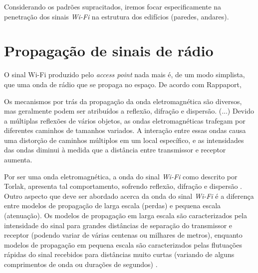\documentclass[
	12pt,				%
	twoside,			%
	a4paper,			%
	english,			%
	french,				%
	spanish,			%
	brazil				%
	]{abntex2}
\begin{document}
Considerando os padrões supracitados, iremos focar especificamente na
penetração dos sinais \emph{Wi-Fi} na estrutura dos edifícios (paredes,
andares).

\section{Propagação de sinais de
rádio}\label{propagauxe7uxe3o-de-sinais-de-ruxe1dio}

O sinal Wi-Fi produzido pelo \emph{access point} nada mais é, de um modo
simplista, que uma onda de rádio que se propaga no espaço. De acordo com
Rappaport,

\begin{citacao}
    Os mecanismos por trás da propagação da onda eletromagnética são diversos, mas geralmente podem ser atribuídos a reflexão, difração e dispersão. (...) Devido a múltiplas reflexões de vários objetos, as ondas eletromagnéticas trafegam por diferentes caminhos de tamanhos variados. A interação entre essas ondas causa uma distorção de caminhos múltiplos em um local específico, e as intensidades das ondas diminui à medida que a distância entre transmissor e receptor aumenta. \cite[p. 72]{RAPPAPORT}
    
\end{citacao}

Por ser uma onda eletromagnética, a onda do sinal \emph{Wi-Fi} como
descrito por Torlak, apresenta tal comportamento, sofrendo reflexão,
difração e dispersão \cite{TORLAK}. Outro aspecto que deve ser abordado
acerca da onda do sinal \emph{Wi-Fi} é a diferença entre modelos de
propagação de larga escala (perdas) e pequena escala (atenuação). Os
modelos de propagação em larga escala são caracterizados pela
intensidade do sinal para grandes distâncias de separação do transmissor
e receptor (podendo variar de várias centenas ou milhares de metros),
enquanto modelos de propagação em pequena escala são caracterizados
pelas flutuações rápidas do sinal recebidos para distâncias muito curtas
(variando de alguns comprimentos de onda ou durações de segundos)
\cite[p. 72]{RAPPAPORT}.
\end{document}
